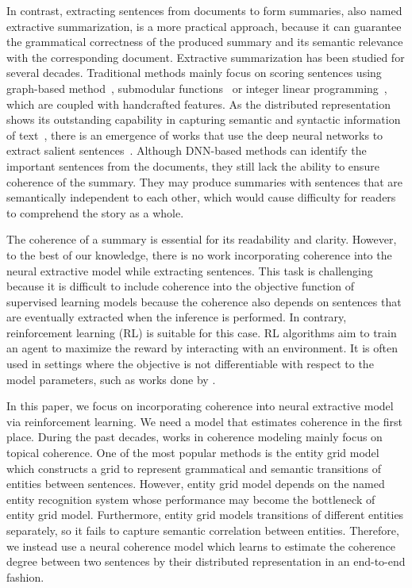 \documentclass[letterpaper]{article} \usepackage{aaai18}  \usepackage{times}  \usepackage{helvet}  \usepackage{courier}  \usepackage{url}  \usepackage{graphicx}  \usepackage{amssymb}
\begin{document}
	In contrast, extracting sentences from documents to form summaries, also named extractive summarization, is a more practical approach, because it can guarantee the grammatical correctness of the produced summary and its semantic relevance with the corresponding document. Extractive summarization has been studied for several decades. Traditional methods mainly focus on scoring sentences using graph-based method~\cite{graph_based}, submodular functions~\cite{lin_class_2011} or integer linear programming~\cite{ilp}, which are coupled with handcrafted features. As the distributed representation shows its outstanding capability in capturing semantic and syntactic information of text~\cite{word2vec,DNV}, there is an emergence of works that use the deep neural networks to extract salient sentences~\cite{jianpeng2016,SummaRuNNer}. Although DNN-based methods can identify the important sentences from the documents, they still lack the ability to ensure coherence of the summary. They may produce summaries with sentences that are semantically independent to each other, which would cause difficulty for readers to comprehend the story as a whole. 
	
	The coherence of a summary is essential for its readability and clarity. However, to the best of our knowledge, there is no work incorporating coherence into the neural extractive model while extracting sentences. This task is challenging because it is difficult to include coherence into the objective function of supervised learning models because the coherence also depends on sentences that are eventually extracted when the inference is performed. In contrary, reinforcement learning (RL) is suitable for this case. RL algorithms aim to train an agent to maximize the reward by interacting with an environment. It is often used in settings where the objective is not differentiable with respect to the model parameters, such as works done by \cite{socher2017_summarization,rl2nmt}.
	
	In this paper, we focus on incorporating coherence into neural extractive model via reinforcement learning. We need a model that estimates coherence in the first place. During the past decades, works in coherence modeling mainly focus on topical coherence. One of the most popular methods is the entity grid model~\cite{entitygrid} which constructs a grid to represent grammatical and semantic transitions of entities between sentences. However, entity grid model depends on the named entity recognition system whose performance may become the bottleneck of entity grid model. Furthermore, entity grid models transitions of different entities separately, so it fails to capture semantic correlation between entities. Therefore, we instead use a neural coherence model which learns to estimate the coherence degree between two sentences by their distributed representation in an end-to-end fashion. 
	
\end{document}
